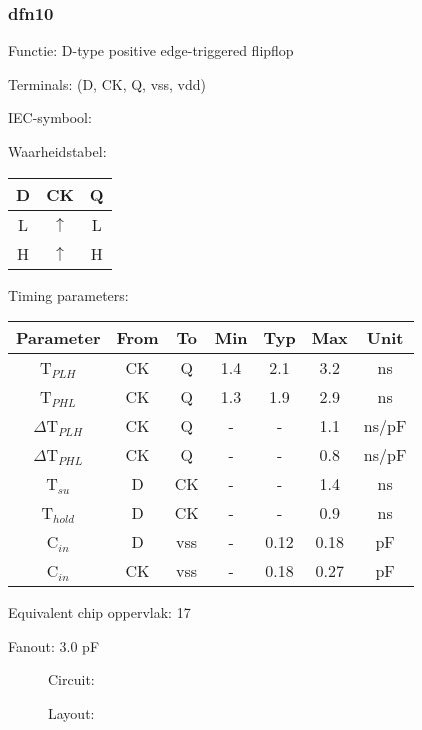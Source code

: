 \subsubsection{dfn10}
Functie: D-type positive edge-triggered flipflop

Terminals: (D, CK, Q, vss, vdd)


IEC-symbool:
\begin{figure}[h]
\end{figure}

Waarheidstabel:
\begin{table}[h]
\begin{tabular}{|c|c||c|}
\hline
D	&CK	&Q\\
\hline
L	&$\uparrow$	&L\\
H	&$\uparrow$	&H\\
\hline
\end{tabular}
\vspace{1cm}

Timing parameters:\\

\begin{tabular}{|c|cc|ccc|c|}
\hline
Parameter               &From            &To   &Min	&Typ	&Max    &Unit\\
\hline
T$_{PLH}$               &CK     	&Q     &1.4	&2.1	&3.2    &ns\\
T$_{PHL}$               &CK    		&Q     &1.3	&1.9	&2.9    &ns\\
\hline
$\Delta$T$_{PLH}$       &CK          	&Q	&-	&-	&1.1    &ns/pF\\
$\Delta$T$_{PHL}$       &CK           	&Q    	&-	&-	&0.8    &ns/pF\\
\hline
T$_{su}$		&D		&CK	&-	&-	&1.4	&ns\\
T$_{hold}$		&D		&CK	&-	&-	&0.9	&ns\\
\hline
C$_{in}$                &D	    	&vss    &-	&0.12	&0.18   &pF\\
C$_{in}$                &CK	    	&vss    &-	&0.18	&0.27   &pF\\
\hline
\end{tabular}
\end{table}

Equivalent chip oppervlak: 17

Fanout: 3.0 pF

\clearpage
\begin{figure}[h]
Circuit:\\


\vspace{0.5cm}
Layout:\\

\end{figure}
\clearpage
